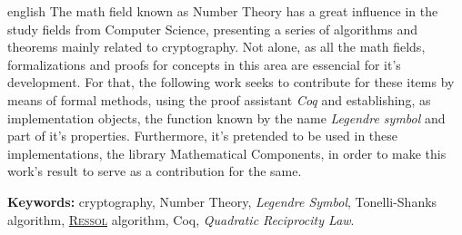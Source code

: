 \begin{resumo}[Abstract]
        \begin{otherlanguage*}{english}
                The math field known as Number Theory has a great influence in the study fields from Computer Science, presenting a series of algorithms and theorems mainly related to cryptography. Not alone, as all the math fields, formalizations and proofs for concepts in this area are essencial for it's development. For that, the following work seeks to contribute for these items by means of formal methods, using the proof assistant \textit{Coq} and establishing, as implementation objects, the function known by the name \textit{Legendre symbol} and part of it's properties. Furthermore, it's pretended to be used in these implementations, the library Mathematical Components, in order to make this work's result to serve as a contribution for the same.
                
                \vspace{\onelineskip}
                
                \noindent
                \textbf{Keywords:} cryptography, Number Theory, \textit{Legendre Symbol}, Tonelli-Shanks algorithm, \hyperref[algo:ressol]{\textsc{Ressol}} algorithm, Coq, \textit{Quadratic Reciprocity Law}.
        \end{otherlanguage*}
\end{resumo}